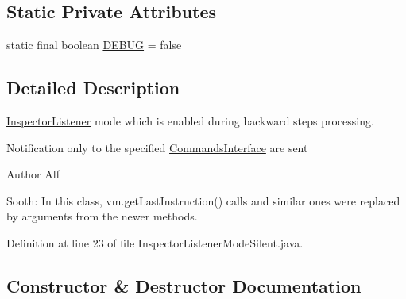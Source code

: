\subsection*{Static Private Attributes}
\begin{DoxyCompactItemize}
\item 
static final boolean \hyperlink{classgov_1_1nasa_1_1jpf_1_1inspector_1_1server_1_1jpf_1_1_inspector_listener_mode_silent_aace7f1715e5614ddeed907df30ba9949}{D\+E\+B\+UG} = false
\end{DoxyCompactItemize}


\subsection{Detailed Description}
\hyperlink{classgov_1_1nasa_1_1jpf_1_1inspector_1_1server_1_1jpf_1_1_inspector_listener}{Inspector\+Listener} mode which is enabled during backward steps processing. 

Notification only to the specified \hyperlink{}{Commands\+Interface} are sent

\begin{DoxyAuthor}{Author}
Alf
\end{DoxyAuthor}
Sooth\+: In this class, vm.\+get\+Last\+Instruction() calls and similar ones were replaced by arguments from the newer methods. 

Definition at line 23 of file Inspector\+Listener\+Mode\+Silent.\+java.



\subsection{Constructor \& Destructor Documentation}
